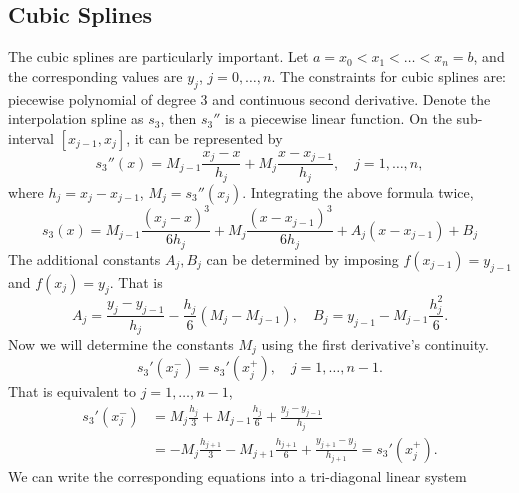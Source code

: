 \subsection{Cubic Splines}
The cubic splines are particularly important. Let $a = x_0 < x_1 <\dots < x_n = b$, and the corresponding values are $y_j$, $j = 0, \dots, n$. The constraints for cubic splines are: piecewise polynomial of degree 3 and continuous second derivative. Denote the interpolation spline as $s_3$, then $s_3''$ is a piecewise linear function. On the sub-interval $[x_{j-1}, x_j]$, it can be represented by 
\begin{equation}
    s_3''(x) = M_{j-1} \frac{x_j - x}{h_j} + M_j \frac{x - x_{j-1}}{h_j},\quad j = 1,\dots, n,
\end{equation}
where $h_j = x_j - x_{j-1}$, $M_j = s_3''(x_j)$. Integrating the above formula twice, 
\begin{equation}
    s_3(x) = M_{j-1} \frac{(x_j - x)^3}{6 h_j} + M_j \frac{(x - x_{j-1})^3}{6h_j} + A_j (x - x_{j-1}) + B_j
\end{equation}
The additional constants $A_j, B_j$ can be determined by imposing $f(x_{j-1}) = y_{j-1}$ and $f(x_j) = y_j$. That is 
\begin{equation}
    A_j = \frac{y_j - y_{j-1}}{h_j} - \frac{h_j}{6}(M_j - M_{j-1}),\quad 
    B_j = y_{j-1}-  M_{j-1} \frac{h_j^2}{6}.
\end{equation}
Now we will determine the constants $M_j$ using the first derivative's continuity. 
\begin{equation}
    s_3'(x_{j}^{-})  = s_3'(x_j^{+}), \quad j = 1,\dots, n-1.
\end{equation}
That is equivalent to $j=1,\dots, n-1$, 
\begin{equation}
    \begin{aligned}
        s_3'(x_{j}^{-})  &= M_j\frac{h_j}{3} + M_{j-1}\frac{h_{j}}{6} + \frac{y_j - y_{j-1}}{h_j}  \\
        &= -M_j \frac{h_{j+1}}{3}  - M_{j+1}\frac{h_{j+1}}{6} + \frac{y_{j+1} - y_j}{h_{j+1}} = s_3'(x_j^{+}). 
    \end{aligned}
\end{equation}
We can write the corresponding equations into a tri-diagonal linear system 
